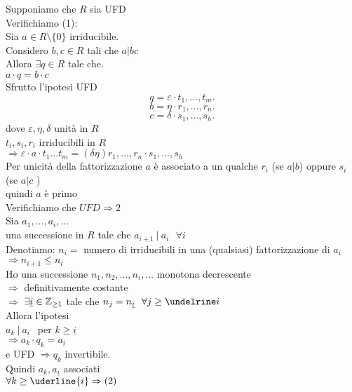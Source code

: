 \documentclass[12px]{article}
\begin{document}
\begin{dimo}
	Supponiamo che $R$ sia UFD\\
	Verifichiamo (1):\\
	Sia $a\in R\setminus\{0\}$ irriducibile.\\
	Considero  $b,c\in R$ tali che  $a | bc$\\
	Allora  $\exists q\in R$ tale che.\\
	 $a\cdot q = b\cdot c$\\
	 Sfrutto l'ipotesi UFD
	  \[
	  q = \varepsilon \cdot t_1,\ldots,t_m
	 .\] 
	  \[
	  b = \eta \cdot r_1,\ldots,r_n
	 .\] 
	  \[
	  c = \delta \cdot s_1,\ldots,s_h
	 .\] 
	 dove $\varepsilon,\eta,\delta$ unità in  $R$\\
	  $t_i,s_i,r_i$ irriducibili in  $R$\\
	    $ \Rightarrow \varepsilon\cdot a \cdot t_1\ldots t_m = (\delta\eta)r_1,\ldots,r_n\cdot s_1,\ldots,s_h$\\
	    Per unicità della fattorizzazione $a$ è associato a un qualche $r_i$ (se $a | b$) oppure $s_i$ (se  $a | c$ ) \\
	    quindi $a$ è primo\\[10px]
	    Verifichiamo che  $UFD \Rightarrow 2 $ \\
	    Sia $a_1,\ldots, a_i,\ldots$\\
	    una successione in $R$ tale che $a_{i+1} \ | \ a_i \ \ \ \forall i$\\
	    Denotiamo:
	     $n_i = $ numero di irriducibili in una (qualsiasi) fattorizzazione di $a_i$\\
	     $ \Rightarrow  n_{i+1}\leq n_i$ \\
	     Ho una successione $n_1,n_2,\ldots,n_i,\ldots$ monotona decrescente\\
	     $ \Rightarrow $ definitivamente costante\\
	     $ \Rightarrow $ $\exists \underline i\in\mathbb{Z}_{\geq 1}$ tale che  $n_j = n_{\underline i} \ \ \forall j\geq \undelrine i$\\
	     Allora l'ipotesi\\
	     $a_k \ | \ a_{\underline i} \ \ $ per $k\geq \underline i$\\
	     $ \Rightarrow a_k\cdot q_k = a_{\underline i}$ \\
	     e UFD $ \Rightarrow  q_k$ invertibile.\\
	     Quindi $a_k,a_{\underline i}$ associati\\
	     $\forall k\geq \uderline{i} \Rightarrow (2)$ \\

\end{dimo}
\end{document}
